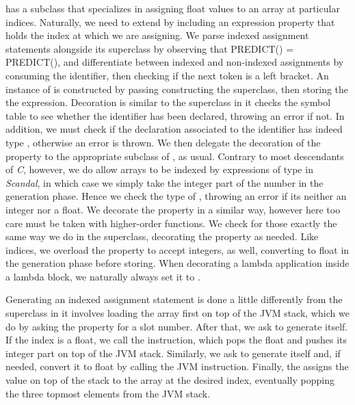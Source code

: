  has a subclass that specializes in assigning float values to an array at particular indices. Naturally, we need to extend  by including an expression property that holds the index at which we are assigning. We parse indexed assignment statements alongside its superclass by observing that PREDICT() = PREDICT(), and differentiate between indexed and non-indexed assignments by consuming the identifier, then checking if the next token is a left bracket. An instance of  is constructed by passing constructing the superclass, then storing the the  expression. Decoration is similar to the superclass in it checks the symbol table to see whether the identifier has been declared, throwing an error if not. In addition, we must check if the declaration associated to the identifier has indeed type , otherwise an error is thrown. We then delegate the decoration of the  property to the appropriate subclass of , as usual. Contrary to most descendants of \emph{C}, however, we do allow arrays to be indexed by expressions of type  in \emph{Scandal}, in which case we simply take the integer part of the number in the generation phase. Hence we check the type of , throwing an error if its neither an integer nor a float. We decorate the  property in a similar way, however here too care must be taken with higher-order functions. We check for those exactly the same way we do in the superclass, decorating the  property as needed. Like indices, we overload the  property to accept integers, as well, converting to float in the generation phase before storing. When decorating a lambda application inside a lambda block, we naturally always set it to .

Generating an indexed assignment statement is done a little differently from the superclass in it involves loading the array first on top of the JVM stack, which we do by asking the  property for a slot number. After that, we ask  to generate itself. If the index is a float, we call the  instruction, which pops the float and pushes its integer part on top of the JVM stack. Similarly, we ask  to generate itself and, if needed, convert it to float by calling the  JVM instruction. Finally, the  assigns the value on top of the stack to the array at the desired index, eventually popping the three topmost elements from the JVM stack.

